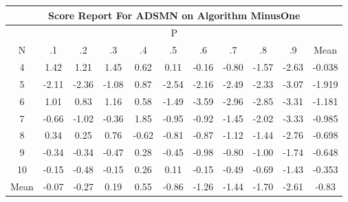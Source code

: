 \documentclass[11pt,a4paper]{report}
\begin{document}
\begin{longtable}{ | c || c | c | c | c | c | c | c | c | c || c |}
\hline
\multicolumn{11}{|c|}{ Score Report For ADSMN on Algorithm MinusOne} \\
\hline
\multicolumn{11}{|c|}{ P } \\
\hline
N & .1 & .2 & .3 & .4 & .5 & .6 & .7 & .8 & .9 & Mean\\
 \hline
 \hline
 \endhead
  4 &  \cellcolor[HTML]{DFDFFF} 1.42 &  \cellcolor[HTML]{DFDFFF} 1.21 &  \cellcolor[HTML]{D7D7FF} 1.45 &  \cellcolor[HTML]{EFEFFF} 0.62 &  \cellcolor[HTML]{FFFFFF} 0.11 &  \cellcolor[HTML]{FFFFFF} -0.16 &  \cellcolor[HTML]{FFE7E7} -0.80 &  \cellcolor[HTML]{FFD7D7} -1.57 &  \cellcolor[HTML]{FFBFBF} -2.63 & -0.038 \\
  5 &  \cellcolor[HTML]{FFC7C7} -2.11 &  \cellcolor[HTML]{FFC7C7} -2.36 &  \cellcolor[HTML]{FFE7E7} -1.08 &  \cellcolor[HTML]{E7E7FF} 0.87 &  \cellcolor[HTML]{FFBFBF} -2.54 &  \cellcolor[HTML]{FFC7C7} -2.16 &  \cellcolor[HTML]{FFBFBF} -2.49 &  \cellcolor[HTML]{FFC7C7} -2.33 &  \cellcolor[HTML]{FFAFAF} -3.07 & -1.919 \\
  6 &  \cellcolor[HTML]{E7E7FF} 1.01 &  \cellcolor[HTML]{E7E7FF} 0.83 &  \cellcolor[HTML]{DFDFFF} 1.16 &  \cellcolor[HTML]{EFEFFF} 0.58 &  \cellcolor[HTML]{FFD7D7} -1.49 &  \cellcolor[HTML]{FFA7A7} -3.59 &  \cellcolor[HTML]{FFB7B7} -2.96 &  \cellcolor[HTML]{FFB7B7} -2.85 &  \cellcolor[HTML]{FFAFAF} -3.31 & -1.181 \\
  7 &  \cellcolor[HTML]{FFEFEF} -0.66 &  \cellcolor[HTML]{FFE7E7} -1.02 &  \cellcolor[HTML]{FFF7F7} -0.36 &  \cellcolor[HTML]{CFCFFF} 1.85 &  \cellcolor[HTML]{FFE7E7} -0.95 &  \cellcolor[HTML]{FFE7E7} -0.92 &  \cellcolor[HTML]{FFD7D7} -1.45 &  \cellcolor[HTML]{FFCFCF} -2.02 &  \cellcolor[HTML]{FFAFAF} -3.33 & -0.985 \\
  8 &  \cellcolor[HTML]{F7F7FF} 0.34 &  \cellcolor[HTML]{F7F7FF} 0.25 &  \cellcolor[HTML]{EFEFFF} 0.76 &  \cellcolor[HTML]{FFEFEF} -0.62 &  \cellcolor[HTML]{FFE7E7} -0.81 &  \cellcolor[HTML]{FFE7E7} -0.87 &  \cellcolor[HTML]{FFDFDF} -1.12 &  \cellcolor[HTML]{FFD7D7} -1.44 &  \cellcolor[HTML]{FFB7B7} -2.76 & -0.698 \\
  9 &  \cellcolor[HTML]{FFF7F7} -0.34 &  \cellcolor[HTML]{FFF7F7} -0.34 &  \cellcolor[HTML]{FFF7F7} -0.47 &  \cellcolor[HTML]{F7F7FF} 0.28 &  \cellcolor[HTML]{FFF7F7} -0.45 &  \cellcolor[HTML]{FFE7E7} -0.98 &  \cellcolor[HTML]{FFE7E7} -0.80 &  \cellcolor[HTML]{FFE7E7} -1.00 &  \cellcolor[HTML]{FFD7D7} -1.74 & -0.648 \\
  10 &  \cellcolor[HTML]{FFFFFF} -0.15 &  \cellcolor[HTML]{FFEFEF} -0.48 &  \cellcolor[HTML]{FFFFFF} -0.15 &  \cellcolor[HTML]{F7F7FF} 0.26 &  \cellcolor[HTML]{FFFFFF} 0.11 &  \cellcolor[HTML]{FFFFFF} -0.15 &  \cellcolor[HTML]{FFEFEF} -0.49 &  \cellcolor[HTML]{FFEFEF} -0.69 &  \cellcolor[HTML]{FFD7D7} -1.43 & -0.353 \\
 \hline
 \hline
Mean &  \cellcolor[HTML]{FFFFFF} -0.07 &  \cellcolor[HTML]{FFF7F7} -0.27 &  \cellcolor[HTML]{F7F7FF} 0.19 &  \cellcolor[HTML]{EFEFFF} 0.55 &  \cellcolor[HTML]{FFE7E7} -0.86 &  \cellcolor[HTML]{FFDFDF} -1.26 &  \cellcolor[HTML]{FFD7D7} -1.44 &  \cellcolor[HTML]{FFD7D7} -1.70 &  \cellcolor[HTML]{FFBFBF} -2.61 &  \cellcolor[HTML]{FFE7E7} -0.83
\end{longtable}
\end{document}
